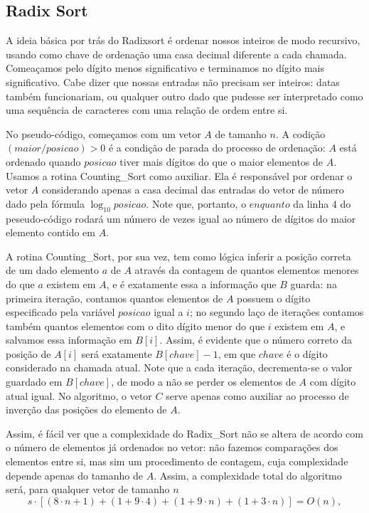 \documentclass{article}
\begin{document}
\subsection{Radix Sort}
A ideia básica por trás do Radixsort é ordenar nossos inteiros de modo recursivo, usando como chave de ordenação uma casa decimal diferente a cada chamada. Comeaçamos pelo dígito menos significativo e terminamos no dígito mais significativo. Cabe dizer que nossas entradas não precisam ser inteiros: datas também funcionariam, ou qualquer outro dado que pudesse ser interpretado como uma sequência de caracteres com uma relação de ordem entre si.\par
%
No pseudo-código, começamos com um vetor $A$ de tamanho $n$. A codição $(maior/posicao)>0$ é a condição de parada do processo de ordenação: $A$ está ordenado quando $posicao$ tiver mais dígitos do que o maior elementos de $A$. Usamos a rotina Counting\_Sort como auxiliar. Ela é responsável por ordenar o vetor $A$ considerando apenas a casa decimal das entradas do vetor de número dado pela fórmula $\log_{10} posicao$. Note que, portanto, o $enquanto$ da linha 4 do peseudo-código rodará um número de vezes igual ao número de dígitos do maior elemento contido em $A$.\par
%
A rotina Counting\_Sort, por sua vez, tem como lógica inferir a posição correta de um dado elemento $a$ de $A$ através da contagem de quantos elementos menores do que $a$ existem em $A$, e é exatamente essa a informação que $B$ guarda: na primeira iteração, contamos quantos elementos de $A$ possuem o dígito especificado pela variável $posicao$ igual a $i$; no segundo laço de iterações contamos também quantos elementos com o dito dígito menor do que $i$ existem em $A$, e salvamos essa informação em $B[i]$. Assim, é evidente que o número correto da posição de $A[i]$ será exatamente $B[chave] - 1$, em que $chave$ é o dígito considerado na chamada atual. Note que a cada iteração, decrementa-se o valor guardado em $B[chave]$, de modo a não se perder os elementos de $A$ com dígito atual igual. No algoritmo, o vetor $C$ serve apenas como auxiliar ao processo de inverção das posições do elemento de $A$.\par
%
Assim, é fácil ver que a complexidade do Radix\_Sort não se altera de acordo com o número de elementos já ordenados no vetor: não fazemos comparações dos elementos entre si, mas sim um procedimento de contagem, cuja complexidade depende apenas do tamanho de $A$. Assim, a complexidade total do algoritmo será, para qualquer vetor de tamanho $n$ \[s\cdot\left[(8 \cdot n + 1) + (1 + 9\cdot4) + (1 + 9\cdot n) + (1 + 3\cdot n)\right] = O(n),\]
\end{document}
